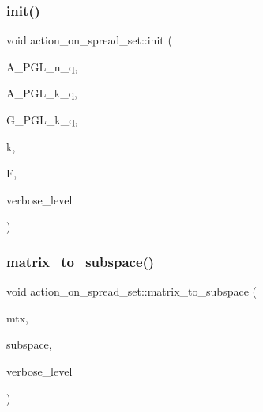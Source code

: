 \subsubsection{\texorpdfstring{init()}{init()}}
{\footnotesize\ttfamily void action\+\_\+on\+\_\+spread\+\_\+set\+::init (\begin{DoxyParamCaption}\item[{\mbox{\hyperlink{classaction}{action}} $\ast$}]{A\+\_\+\+P\+G\+L\+\_\+n\+\_\+q,  }\item[{\mbox{\hyperlink{classaction}{action}} $\ast$}]{A\+\_\+\+P\+G\+L\+\_\+k\+\_\+q,  }\item[{\mbox{\hyperlink{classsims}{sims}} $\ast$}]{G\+\_\+\+P\+G\+L\+\_\+k\+\_\+q,  }\item[{\mbox{\hyperlink{galois_8h_a09fddde158a3a20bd2dcadb609de11dc}{I\+NT}}}]{k,  }\item[{\mbox{\hyperlink{classfinite__field}{finite\+\_\+field}} $\ast$}]{F,  }\item[{\mbox{\hyperlink{galois_8h_a09fddde158a3a20bd2dcadb609de11dc}{I\+NT}}}]{verbose\+\_\+level }\end{DoxyParamCaption})}

\mbox{\label{classaction__on__spread__set_a288c7e842caf8b47b046cdc5fc2aca73}} 
\subsubsection{\texorpdfstring{matrix\+\_\+to\+\_\+subspace()}{matrix\_to\_subspace()}}
{\footnotesize\ttfamily void action\+\_\+on\+\_\+spread\+\_\+set\+::matrix\+\_\+to\+\_\+subspace (\begin{DoxyParamCaption}\item[{\mbox{\hyperlink{galois_8h_a09fddde158a3a20bd2dcadb609de11dc}{I\+NT}} $\ast$}]{mtx,  }\item[{\mbox{\hyperlink{galois_8h_a09fddde158a3a20bd2dcadb609de11dc}{I\+NT}} $\ast$}]{subspace,  }\item[{\mbox{\hyperlink{galois_8h_a09fddde158a3a20bd2dcadb609de11dc}{I\+NT}}}]{verbose\+\_\+level }\end{DoxyParamCaption})}

\mbox{\label{classaction__on__spread__set_ae098ae70505b0044df033e8431898602}} 
